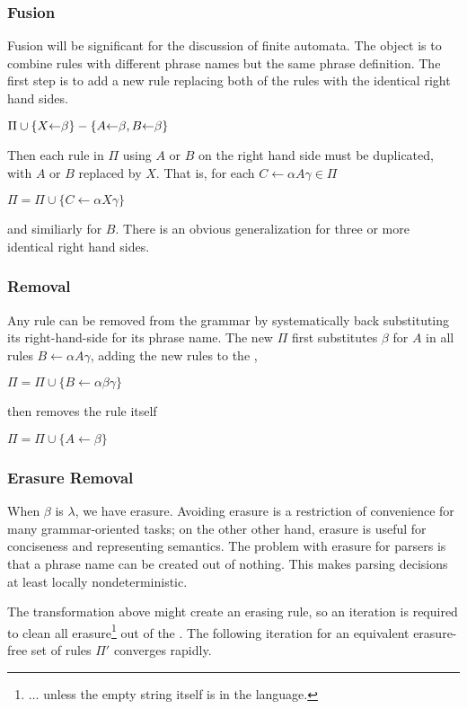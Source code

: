 \begin{enumerate}
\subsubsection{Fusion}
\noindent Fusion will be significant for the discussion of finite 
automata.  
The object is to combine rules with different phrase names but
the same phrase definition.
The first step is to add a new rule replacing both of the rules
with the identical right hand sides.

$\Pi \cup \{X\mbox{$\leftarrow$}\beta\} 
        - \{A\mbox{$\leftarrow$}\beta, B\mbox{$\leftarrow$}\beta\}$

\noindent Then each rule in $\Pi$ using $A$ or $B$ on the right hand side 
must be duplicated, with $A$ or $B$ replaced by $X$.  That is, for each 
$C\leftarrow\alpha A\gamma \in \Pi$

$\Pi = \Pi \cup \{C\leftarrow\alpha X \gamma \}$

\noindent and similiarly for $B$.  
There is an obvious generalization for three or more identical right hand
sides.

\subsubsection{Removal}

Any rule can be removed from the grammar by systematically
back substituting its right-hand-side for its phrase name.
The new $\Pi$ first substitutes $\beta$ for $A$ in all rules 
$B\leftarrow \alpha A \gamma$, adding the new rules to the \cfg,

$\Pi = \Pi \cup \{B\leftarrow \alpha\beta\gamma\}$

\noindent then removes the rule itself

$\Pi = \Pi \cup \{A\leftarrow\beta \}$

\subsubsection{Erasure Removal}

When $\beta$ is $\lambda$, we have erasure.
Avoiding erasure is a restriction of convenience for many
grammar-oriented tasks; 
on the other other hand, 
erasure is useful for conciseness and representing semantics.  
The problem with erasure for parsers is that a phrase name can be 
created out of nothing.  
This makes parsing decisions at least locally nondeterministic.  

The transformation above might create an erasing rule, 
so an iteration is required to clean all 
erasure\footnote{$\ldots$ unless the empty string itself is in the
language.} out of the \cfg.  
The following iteration for an equivalent erasure-free set 
of rules $\Pi'$ converges rapidly.


\end{enumerate}
